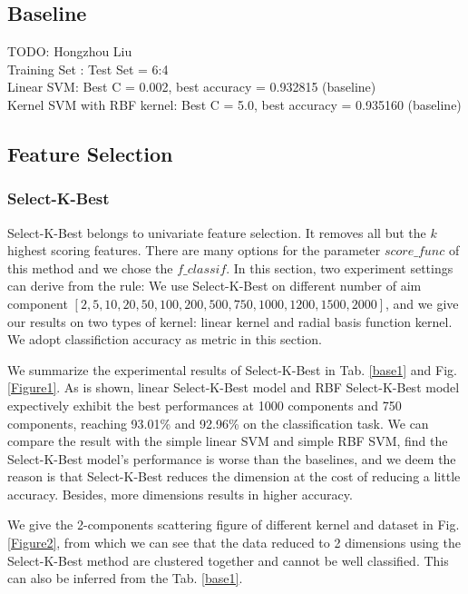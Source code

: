 \documentclass{article}
\begin{document}
\subsection{Baseline}
TODO: Hongzhou Liu\\
Training Set : Test Set = 6:4 \\
Linear SVM: Best C = 0.002, best accuracy = 0.932815 (baseline) \\
Kernel SVM with RBF kernel: Best C = 5.0, best accuracy = 0.935160 (baseline) \\
\subsection{Feature Selection}
\subsubsection{Select-K-Best}
Select-K-Best belongs to univariate feature selection. It removes all but the $k$ highest scoring features. There are many options for the parameter $score\_func$ of this method and we chose the $f\_classif$. In this section, two experiment settings can derive from the rule: We use Select-K-Best on different number of aim component $[2, 5, 10, 20, 50, 100, 200, 500, 750, 1000, 1200, 1500, 2000]$, and we give our results on two types of kernel: linear kernel and radial basis function kernel. We adopt classifiction accuracy as metric in this section.

We summarize the experimental results of Select-K-Best in Tab. \ref{base1} and Fig. \ref{Figure1}. As is shown, linear Select-K-Best model and RBF Select-K-Best model expectively exhibit the best performances at 1000 components and 750 components, reaching 93.01\% and 92.96\% on the classification task. We can compare the result with the simple linear SVM and simple RBF SVM, find the Select-K-Best model's performance is worse than the baselines, and we deem the reason is that Select-K-Best reduces the dimension at the cost of reducing a little accuracy. Besides, more dimensions results in higher accuracy.

We give the 2-components scattering figure of different kernel and dataset in Fig. \ref{Figure2}, from which we can see that the data reduced to 2 dimensions using the Select-K-Best method are clustered together and cannot be well classified. This can also be inferred from the Tab. \ref{base1}.
\end{document}
